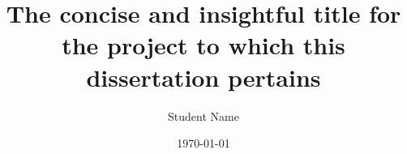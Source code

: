 %
%

\makeatletter
\title{The concise and insightful title for the project to which this dissertation pertains}	\let\Title\@title
\author{Student Name}	\let\Author\@author
\date{\today} \let\Date\@date
\makeatother

\newcommand{\StudentId}{01234567}
\newcommand{\AcademicYear}{Academic Year 2014 -- 2015}
